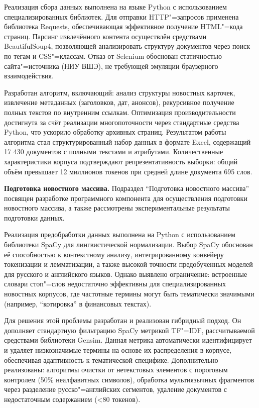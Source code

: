 \documentclass[autoref]{SCWorks}
\begin{document}
Реализация сбора данных выполнена на языке Python с использованием
специализированных библиотек. Для отправки HTTP"=запросов применена библиотека
Requests, обеспечивающая эффективное получение HTML"=кода страниц. Парсинг
извлечённого контента осуществлён средствами BeautifulSoup4, позволяющей
анализировать структуру документов через поиск по тегам и CSS"=классам. Отказ от
Selenium обоснован статичностью сайта"=источника (НИУ ВШЭ), не требующей
эмуляции браузерного взаимодействия.

Разработан алгоритм, включающий: анализ структуры новостных карточек, извлечение
метаданных (заголовков, дат, анонсов), рекурсивное получение полных текстов по
внутренним ссылкам. Оптимизация производительности достигнута за счёт реализации
многопоточности через стандартные средства Python, что ускорило обработку
архивных страниц. Результатом работы алгоритма стал структурированный набор
данных в формате Excel, содержащий 17 430 документов с полными текстами и
атрибутами. Количественные характеристики корпуса подтверждают
репрезентативность выборки: общий объём превышает 12 миллионов токенов при
средней длине документа 695 слов.

\textbf{Подготовка новостного массива.}
Подраздел \enquote{Подготовка новостного массива} посвящен разработке
программного компонента для осуществления подготовки новостного массива,
а также рассмотрены экспериментальные результаты подготовки данных. 

Реализация предобработки данных выполнена на Python с использованием библиотеки
SpaCy для лингвистической нормализации. Выбор SpaCy обоснован её способностью к
контекстному анализу, интегрированному конвейеру токенизации и лемматизации, а
также высокой точности предобученных моделей для русского и английского языков.
Однако выявлено ограничение: встроенные словари стоп"=слов недостаточно
эффективны для специализированных новостных корпусов, где частотные термины
могут быть тематически значимыми (например, \enquote{котировка} в финансовых
текстах).

Для решения этой проблемы разработан и реализован гибридный подход. Он дополняет
стандартную фильтрацию SpaCy метрикой TF"=IDF, рассчитываемой средствами
библиотеки Gensim. Данная метрика автоматически идентифицирует и удаляет
низкозначимые термины на основе их распределения в корпусе, обеспечивая
адаптивность к тематической специфике. Дополнительно реализованы: алгоритмы
очистки от нетекстовых элементов с пороговым контролем (50\% неалфавитных
символов), обработка мультиязычных фрагментов через разделение
русско"=английских сегментов, удаление документов с недостаточным содержанием
(<80 токенов).
\end{document}
